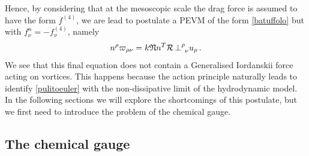 \documentclass[preprints,article,accept,moreauthors,pdftex]{mdpi}
\begin{document}
Hence, by considering that  at the  mesoscopic scale the drag force is assumed to have the form $f^{(4)}$, we are lead to postulate a PEVM of the form \eqref{batuffolo}  but with $f^n_\nu =-f^{(4)}_\nu$, namely
\begin{equation}
\label{nuvarpi}
n^\rho \varpi_{\rho \nu} = k\mathfrak{N}n^T\mathcal{R} \,  {\perp}\indices{^\rho _\nu} u_\rho \, .
\end{equation}
We see that this final equation does not contain a Generalised Iordanskii force acting on vortices.
This happens because the action principle naturally leads to identify \eqref{pulitoeuler} with the non-dissipative  limit of the hydrodynamic model. In the following sections we will explore the shortcomings of this postulate, but we  first need to introduce the problem of the chemical gauge.



\subsection{The chemical gauge} 
\label{chemicalGaugeEEEEE}
\end{document}
